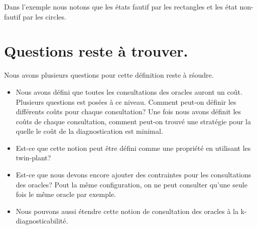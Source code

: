 \documentclass[a4paper,10pt]{article}
\begin{document}
Dans l'exemple nous notons que les \'etats fautif par les rectangles et les \'etat non-fautif par les circles.

\section{Questions reste \`a trouver.}

Nous avons plusieurs questions pour cette d\'efinition reste \`a r\'soudre.

\begin{itemize}
\item Nous avons d\'efini que toutes les consultations des oracles auront un co\^ut. Plusieurs questions est pos\'ees \`a ce niveau. Comment peut-on d\'efinir les diff\'erents co\^uts pour chaque consultation? Une fois nous avons d\'efinit les co\^uts de chaque consultation, comment peut-on trouv\'e une strat\'egie pour la quelle le co\^ut de la diagnostication est minimal.

\item Est-ce que cette notion peut \^etre d\'efini comme une propri\'et\'e en utilisant les twin-plant?

\item Est-ce que nous devons encore ajouter des contraintes pour les consultations des oracles? Pout la m\^eme configuration, on ne peut consulter qu'une seule fois le m\^eme oracle par exemple.

\item Nous pouvons aussi \'etendre cette notion de consultation des oracles \`a la k-diagnosticabilit\'e.
\end{itemize}
\end{document}
